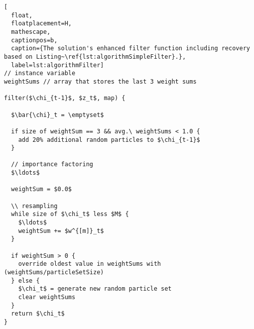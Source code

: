 \begin{lstlisting}[
  float,
  floatplacement=H,
  mathescape,
  captionpos=b,
  caption={The solution's enhanced filter function including recovery based on Listing~\ref{lst:algorithmSimpleFilter}.},
  label=lst:algorithmFilter]
// instance variable
weightSums // array that stores the last 3 weight sums

filter($\chi_{t-1}$, $z_t$, map) {

  $\bar{\chi}_t = \emptyset$

  if size of weightSum == 3 && avg.\ weightSums < 1.0 {
    add 20% additional random particles to $\chi_{t-1}$
  }

  // importance factoring
  $\ldots$

  weightSum = $0.0$

  \\ resampling
  while size of $\chi_t$ less $M$ {
    $\ldots$
    weightSum += $w^{[m]}_t$
  }

  if weightSum > 0 {
    override oldest value in weightSums with (weightSums/particleSetSize)
  } else {
    $\chi_t$ = generate new random particle set
    clear weightSums
  }
  return $\chi_t$
}
\end{lstlisting}
